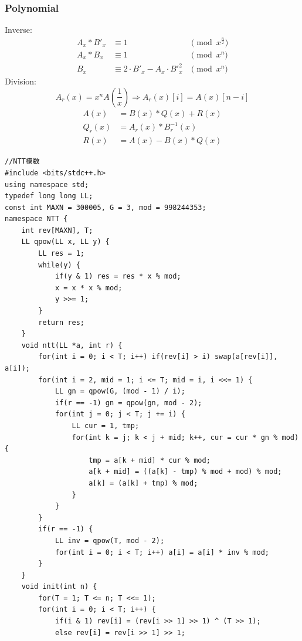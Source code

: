 \documentclass[10pt]{ctexart}
\begin{document}
{\subsubsection{Polynomial}
Inverse: \\
\begin{equation*}
\begin{aligned} 
    A_x * B'_x &\equiv 1 &\pmod {x^{\frac{n}{2}}} \\
    A_x * B_x  &\equiv 1 &\pmod {x^n} \\
    B_x &\equiv 2 \cdot B'_x - A_x \cdot {B'}_{x}^{2} &\pmod {x^n}
\end{aligned}
\end{equation*}
Division: \\
$$
A_r(x) = x^nA(\frac{1}{x}) \Rightarrow A_r(x)[i] = A(x)[n - i]
$$
\begin{equation*}
\begin{aligned} 
    A(x) &= B(x) * Q(x) + R(x) \\
    Q_r(x) &= A_r(x) * B_r^{-1}(x) \\
    R(x) &= A(x) - B(x) * Q(x)
\end{aligned}
\end{equation*}
\begin{lstlisting}
//NTT模数
#include <bits/stdc++.h>
using namespace std;
typedef long long LL;
const int MAXN = 300005, G = 3, mod = 998244353;
namespace NTT {
    int rev[MAXN], T;
    LL qpow(LL x, LL y) {
        LL res = 1;
        while(y) {
            if(y & 1) res = res * x % mod;
            x = x * x % mod;
            y >>= 1;
        }
        return res;
    }
    void ntt(LL *a, int r) {
        for(int i = 0; i < T; i++) if(rev[i] > i) swap(a[rev[i]], a[i]);
        for(int i = 2, mid = 1; i <= T; mid = i, i <<= 1) {
            LL gn = qpow(G, (mod - 1) / i);
            if(r == -1) gn = qpow(gn, mod - 2);
            for(int j = 0; j < T; j += i) {
                LL cur = 1, tmp;
                for(int k = j; k < j + mid; k++, cur = cur * gn % mod) {
                    tmp = a[k + mid] * cur % mod;
                    a[k + mid] = ((a[k] - tmp) % mod + mod) % mod;
                    a[k] = (a[k] + tmp) % mod;
                }
            }
        }
        if(r == -1) {
            LL inv = qpow(T, mod - 2);
            for(int i = 0; i < T; i++) a[i] = a[i] * inv % mod;
        }
    }
    void init(int n) {
        for(T = 1; T <= n; T <<= 1);
        for(int i = 0; i < T; i++) {
            if(i & 1) rev[i] = (rev[i >> 1] >> 1) ^ (T >> 1);
            else rev[i] = rev[i >> 1] >> 1;

\end{lstlisting}}
\end{document}
